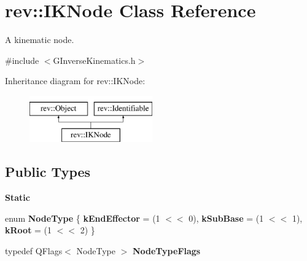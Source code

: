 \hypertarget{classrev_1_1_i_k_node}{}\section{rev\+::I\+K\+Node Class Reference}
\label{classrev_1_1_i_k_node}


A kinematic node.  




{\ttfamily \#include $<$G\+Inverse\+Kinematics.\+h$>$}

Inheritance diagram for rev\+::I\+K\+Node\+:\begin{figure}[H]
\begin{center}
\leavevmode
\includegraphics[height=2.000000cm]{classrev_1_1_i_k_node}
\end{center}
\end{figure}
\subsection*{Public Types}
\begin{Indent}\textbf{ Static}\par
\begin{DoxyCompactItemize}
\item 
\mbox{\label{classrev_1_1_i_k_node_ae2d0a53065d744c0a1fe7e4b2701b233}} 
enum {\bfseries Node\+Type} \{ {\bfseries k\+End\+Effector} = (1 $<$$<$ 0), 
{\bfseries k\+Sub\+Base} = (1 $<$$<$ 1), 
{\bfseries k\+Root} = (1 $<$$<$ 2)
 \}
\item 
\mbox{\label{classrev_1_1_i_k_node_ac7c38c2ecf92387670e9375d58de4a96}} 
typedef Q\+Flags$<$ Node\+Type $>$ {\bfseries Node\+Type\+Flags}
\end{DoxyCompactItemize}
\end{Indent}
